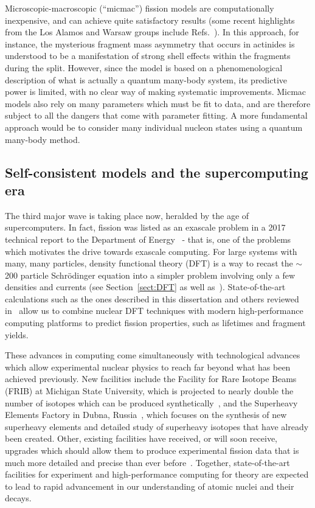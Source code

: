 Microscopic-macroscopic (``micmac'') fission models are computationally inexpensive, and can achieve quite satisfactory results (some recent highlights from the Los Alamos and Warsaw groups include Refs.~\cite{Moller2015a,Moller2015b,Jachimowicz2013,Jachimowicz2017}). In this approach, for instance, the mysterious fragment mass asymmetry that occurs in actinides is understood to be a manifestation of strong shell effects within the fragments during the split. However, since the model is based on a phenomenological description of what is actually a quantum many-body system, its predictive power is limited, with no clear way of making systematic improvements. Micmac models also rely on many parameters which must be fit to data, and are therefore subject to all the dangers that come with parameter fitting. A more fundamental approach would be to consider many individual nucleon states using a quantum many-body method. 

\subsection{Self-consistent models and the supercomputing era}
The third major wave is taking place now, heralded by the age of supercomputers. In fact, fission was listed as an exascale problem in a 2017 technical report to the Department of Energy~\cite{Carlson2017} - that is, one of the problems which motivates the drive towards exascale computing. For large systems with many, many particles, density functional theory (DFT) is a way to recast the ${\sim}$200 particle Schr\"{o}dinger equation into a simpler problem involving only a few densities and currents (see Section~\ref{sect:DFT} as well as~\cite{bender2003}). State-of-the-art calculations such as the ones described in this dissertation and others reviewed in~\cite{schunck2016} allow us to combine nuclear DFT techniques with modern high-performance computing platforms to predict fission properties, such as lifetimes and fragment yields.%

These advances in computing come simultaneously with technological advances which allow experimental nuclear physics to reach far beyond what has been achieved previously. New facilities include the Facility for Rare Isotope Beams (FRIB) at Michigan State University, which is projected to nearly double the number of isotopes which can be produced synthetically~\cite{Baumann2016}, and the Superheavy Elements Factory in Dubna, Russia~\cite{dmitriev2016}, which focuses on the synthesis of new superheavy elements and detailed study of superheavy isotopes that have already been created. Other, existing facilities have received, or will soon receive, upgrades which should allow them to produce experimental fission data that is much more detailed and precise than ever before~\cite{Andreyev2018}. Together, state-of-the-art facilities for experiment and high-performance computing for theory are expected to lead to rapid advancement in our understanding of atomic nuclei and their decays.

